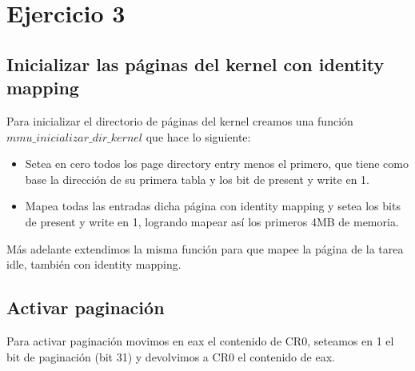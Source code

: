 \section{Ejercicio 3}

\subsection{Inicializar las páginas del kernel con identity mapping}

Para inicializar el directorio de páginas del kernel creamos una función $mmu\_inicializar\_dir\_kernel$ que hace lo siguiente:

\begin{itemize}
	\item Setea en cero todos los page directory entry menos el primero, que tiene como base la dirección de su primera tabla y los bit de present y write en 1.
	\item Mapea todas las entradas dicha página con identity mapping y setea los bits de present y write en 1, logrando mapear así los primeros 4MB de memoria.
\end{itemize}

Más adelante extendimos la misma función para que mapee la página de la tarea idle, también con identity mapping.

\subsection{Activar paginación}

Para activar paginación movimos en eax el contenido de CR0, seteamos en 1 el bit de paginación (bit 31) y devolvimos a CR0 el contenido de eax.
